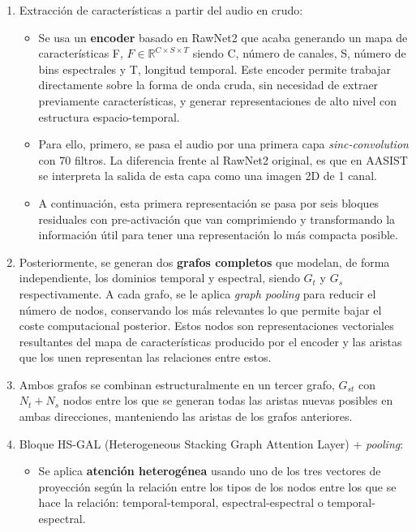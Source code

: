 \begin{enumerate}
    \item Extracción de características a partir del audio en crudo:
        \begin{itemize}
            \item Se usa un \textbf{encoder} basado en RawNet2 que acaba generando un mapa de características F, $F \in \mathbb{R}^{C \times S \times T}$ siendo C, número de canales, S, número de bins espectrales y T, longitud temporal. Este encoder permite trabajar directamente sobre la forma de onda cruda, sin necesidad de extraer previamente características, y generar representaciones de alto nivel con estructura espacio-temporal.
            \item Para ello, primero, se pasa el audio por una primera capa \textit{sinc-convolution} con 70 filtros. La diferencia frente al RawNet2 original, es que en AASIST se interpreta la salida de esta capa como una imagen 2D de 1 canal.
            \item A continuación, esta primera representación se pasa por seis bloques residuales con pre-activación que van comprimiendo y transformando la información útil para tener una representación lo más compacta posible.
        \end{itemize}
    \item Posteriormente, se generan dos \textbf{grafos completos} que modelan, de forma independiente, los dominios temporal y espectral, siendo $G_t$ y $G_s$ respectivamente. A cada grafo, se le aplica \textit{graph pooling} para reducir el número de nodos, conservando los más relevantes lo que permite bajar el coste computacional posterior.
    Estos nodos son representaciones vectoriales resultantes del mapa de características producido por el encoder y las aristas que los unen representan las relaciones entre estos.
    \item Ambos grafos se combinan estructuralmente en un tercer grafo, $G_{st}$ con $N_t+N_s$ nodos entre los que se generan todas las aristas nuevas posibles en ambas direcciones, manteniendo las aristas de los grafos anteriores.
    \item Bloque HS-GAL (Heterogeneous Stacking Graph Attention Layer) + \textit{pooling}:
        \begin{itemize}
            \item Se aplica \textbf{atención heterogénea} usando uno de los tres vectores de proyección según la relación entre los tipos de los nodos entre los que se hace la relación: temporal-temporal, espectral-espectral o temporal-espectral.

\end{itemize}
\end{enumerate}
